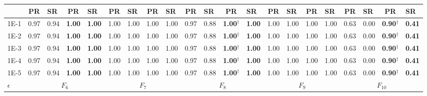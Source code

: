 \begin{table*}[h]
{\begin{tabular}{|p{4.8mm}|p{4.4mm}|p{4.4mm}|p{4.4mm}|p{4.4mm}|p{4.4mm}|p{4.4mm}|p{4.4mm}|p{4.4mm}|p{4.4mm}|p{4.4mm}|p{4.4mm}|p{4.4mm}|p{4.4mm}|p{4.4mm}|p{4.4mm}|p{4.4mm}|p{4.4mm}|p{4.4mm}|p{4.4mm}|p{4.4mm}|}
    \cline{2-21}
     & \multicolumn{1}{c|}{PR} & SR & \multicolumn{1}{c|}{PR} & SR & \multicolumn{1}{c|}{PR} & SR & \multicolumn{1}{c|}{PR} & SR & \multicolumn{1}{c|}{PR} & SR & \multicolumn{1}{c|}{PR} & SR & \multicolumn{1}{c|}{PR} & SR & \multicolumn{1}{c|}{PR} & SR & \multicolumn{1}{c|}{PR} & SR & \multicolumn{1}{c|}{PR} & SR \\
    \hline
    1E-1 & 0.97 & 0.94 & \textcolor{customblue}{\textbf{1.00}} & \textcolor{customblue}{\textbf{1.00}} & 1.00 & 1.00 & 1.00 & 1.00 & 0.97 & 0.88 & \textcolor{customblue}{\textbf{1.00$^\dagger$}} & \textcolor{customblue}{\textbf{1.00}} & 1.00 & 1.00 & 1.00 & 1.00 & 0.63 & 0.00 & \textcolor{customblue}{\textbf{0.90$^\dagger$}} & \textcolor{customblue}{\textbf{0.41}} \\
    1E-2 & 0.97 & 0.94 & \textcolor{customblue}{\textbf{1.00}} & \textcolor{customblue}{\textbf{1.00}} & 1.00 & 1.00 & 1.00 & 1.00 & 0.97 & 0.88 & \textcolor{customblue}{\textbf{1.00$^\dagger$}} & \textcolor{customblue}{\textbf{1.00}} & 1.00 & 1.00 & 1.00 & 1.00 & 0.63 & 0.00 & \textcolor{customblue}{\textbf{0.90$^\dagger$}} & \textcolor{customblue}{\textbf{0.41}} \\
    1E-3 & 0.97 & 0.94 & \textcolor{customblue}{\textbf{1.00}} & \textcolor{customblue}{\textbf{1.00}} & 1.00 & 1.00 & 1.00 & 1.00 & 0.97 & 0.88 & \textcolor{customblue}{\textbf{1.00$^\dagger$}} & \textcolor{customblue}{\textbf{1.00}} & 1.00 & 1.00 & 1.00 & 1.00 & 0.63 & 0.00 & \textcolor{customblue}{\textbf{0.90$^\dagger$}} & \textcolor{customblue}{\textbf{0.41}} \\
    1E-4 & 0.97 & 0.94 & \textcolor{customblue}{\textbf{1.00}} & \textcolor{customblue}{\textbf{1.00}} & 1.00 & 1.00 & 1.00 & 1.00 & 0.97 & 0.88 & \textcolor{customblue}{\textbf{1.00$^\dagger$}} & \textcolor{customblue}{\textbf{1.00}} & 1.00 & 1.00 & 1.00 & 1.00 & 0.63 & 0.00 & \textcolor{customblue}{\textbf{0.90$^\dagger$}} & \textcolor{customblue}{\textbf{0.41}} \\
    1E-5 & 0.97 & 0.94 & \textcolor{customblue}{\textbf{1.00}} & \textcolor{customblue}{\textbf{1.00}} & 1.00 & 1.00 & 1.00 & 1.00 & 0.97 & 0.88 & \textcolor{customblue}{\textbf{1.00$^\dagger$}} & \textcolor{customblue}{\textbf{1.00}} & 1.00 & 1.00 & 1.00 & 1.00 & 0.63 & 0.00 & \textcolor{customblue}{\textbf{0.90$^\dagger$}} & \textcolor{customblue}{\textbf{0.41}} \\
    \hline
    \multirow{3}{*}{$\epsilon$} & \multicolumn{4}{c|}{$F_{6}$} & \multicolumn{4}{c|}{$F_{7}$} & \multicolumn{4}{c|}{$F_{8}$} & \multicolumn{4}{c|}{$F_{9}$} & \multicolumn{4}{c|}{$F_{10}$} \\


\end{tabular}}
\end{table*}

